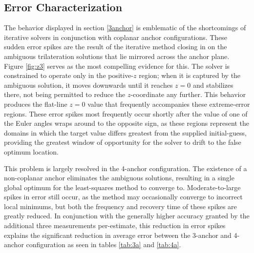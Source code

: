 \documentclass{report}
\begin{document}
			\subsection{Error Characterization}
				The behavior displayed in section \ref{3anchor} is emblematic of the shortcomings of iterative solvers in conjunction with coplanar anchor configurations. These sudden error spikes are the result of the iterative method closing in on the ambiguous trilateration solutions that lie mirrored across the anchor plane. Figure \ref{fig:z3} serves as the most compelling evidence for this. The solver is constrained to operate only in the positive-$z$ region; when it is captured by the ambiguous solution, it moves downwards until it reaches $z=0$ and stabilizes there, not being permitted to reduce the $z$-coordinate any further. This behavior produces the flat-line $z=0$ value that frequently accompanies these extreme-error regions. These error spikes most frequently occur shortly after the value of one of the Euler angles wraps around to the opposite sign, as these regions represent the domains in which the target value differs greatest from the supplied initial-guess, providing the greatest window of opportunity for the solver to drift to the false optimum location.\par
				This problem is largely resolved in the 4-anchor configuration. The existence of a non-coplanar anchor eliminates the ambiguous solutions, resulting in a single global optimum for the least-squares method to converge to. Moderate-to-large spikes in error still occur, as the method may occasionally converge to incorrect local minimums, but both the frequency and recovery time of these spikes are greatly reduced. In conjunction with the generally higher accuracy granted by the additional three measurements per-estimate, this reduction in error spikes explains the significant reduction in average error between the 3-anchor and 4-anchor configuration as seen in tables \ref{tab:3a} and \ref{tab:4a}.
\end{document}
